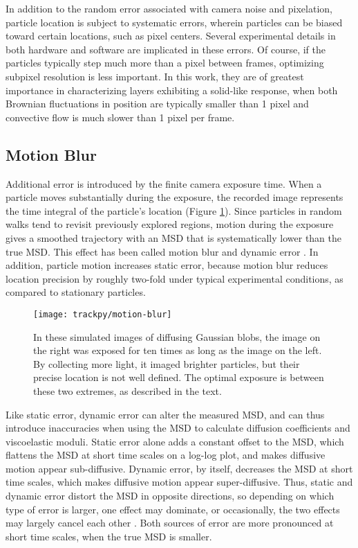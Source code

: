 In addition to the random error associated with camera noise and pixelation, particle location is subject to systematic errors, wherein particles can be biased toward certain locations, such as pixel centers. Several experimental details in both hardware and software are implicated in these errors\cite{Crocker2007}. Of course, if the particles typically step much more than a pixel between frames, optimizing subpixel resolution is less important. In this work, they are of greatest importance in characterizing layers exhibiting a solid-like response, when both Brownian fluctuations in position are typically smaller than 1 pixel and convective flow is much slower than 1 pixel per frame.

\subsection{Motion Blur}

Additional error is introduced by the finite  camera exposure time. When a particle moves substantially during the exposure, the recorded image represents the time integral of the particle's location (Figure \ref{fig:motion-blur}). Since particles in random walks tend to revisit previously explored regions, motion during the exposure gives a smoothed trajectory with an MSD that is systematically lower than the true MSD\cite{Crocker2007,Berg1971a}. This effect has been called motion blur and dynamic error \cite{Savin2005}. In addition, particle motion increases static error, because motion blur reduces location precision by roughly two-fold under typical experimental conditions, as compared to stationary particles\cite{Deschout2012}.

   \begin{figure}
    \centering
    \texttt{[image: trackpy/motion-blur]}
    \caption[Simulated images illustrate the effect of dynamic error (motion blur).]{\label{fig:motion-blur}In these simulated images of diffusing Gaussian blobs, the image on the right was exposed for ten times as long as the image on the left. By collecting more light, it imaged brighter particles, but their precise location is not well defined. The optimal exposure is between these two extremes, as described in the text.}
    \end{figure}

Like static error, dynamic error can alter the measured MSD, and can thus introduce inaccuracies when using the MSD to calculate diffusion coefficients and viscoelastic moduli. Static error alone adds a constant offset to the MSD, which flattens the MSD at short time scales on a log-log plot, and makes diffusive motion appear sub-diffusive\cite{Martin2002a}. Dynamic error, by itself, decreases the MSD at short time scales, which makes diffusive motion appear super-diffusive. Thus, static and dynamic error distort the MSD in opposite directions, so depending on which type of error is larger, one effect may dominate, or occasionally, the two effects may largely cancel each other \cite{Savin2005}. Both sources of error are more pronounced at short time scales, when the true MSD is smaller.

